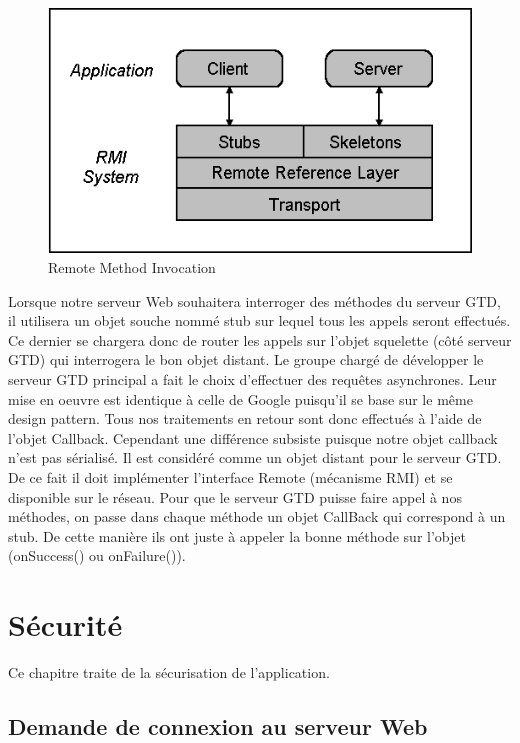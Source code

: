 \begin{figure}[H]
\begin{center}
\includegraphics[scale=0.5]{rmi.png}
\caption{Remote Method Invocation}
\end{center}
\end{figure}

Lorsque notre serveur Web souhaitera interroger des méthodes du serveur GTD, il utilisera un objet souche nommé stub sur lequel tous les appels seront effectués. Ce dernier se chargera donc de router les appels sur l'objet squelette (côté serveur GTD) qui interrogera le bon objet distant.
\bigskip
Le groupe chargé de développer le serveur GTD principal a fait le choix d'effectuer des requêtes asynchrones. Leur mise en oeuvre est identique à celle de Google puisqu'il se base sur le même design pattern. Tous nos traitements en retour sont donc effectués à l'aide de l'objet Callback. Cependant une différence subsiste puisque notre objet callback n'est pas sérialisé. Il est considéré comme un objet distant pour le serveur GTD. De ce fait il doit implémenter l'interface Remote (mécanisme RMI) et se disponible sur le réseau. Pour que le serveur GTD puisse faire appel à nos méthodes, on passe dans chaque méthode un objet CallBack qui correspond à un stub. De cette manière ils ont juste à appeler la bonne méthode sur l'objet (onSuccess() ou onFailure()).


\chapter{Sécurité}

Ce chapitre traite de la sécurisation de l'application. 

\section{Demande de connexion au serveur Web}

